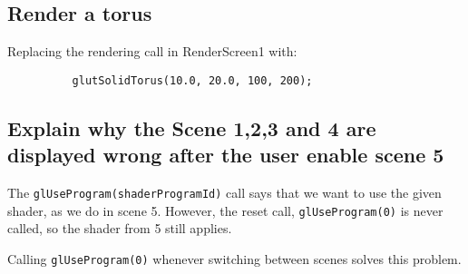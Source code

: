 \documentclass[11pt,a4paper]{article}
\begin{document}
    \subsection{Render a torus} %
      \label{sub:render_a_torus}
      
        Replacing the rendering call in RenderScreen1 with:

        \begin{verbatim}
          glutSolidTorus(10.0, 20.0, 100, 200);
        \end{verbatim}


    \subsection{Explain why the Scene 1,2,3 and 4 are displayed wrong after the user enable scene 5} %
    \label{sub:explain_why_the_scene_1_2_3_and_4_are_displayed_wrong_after_the_user_enable_scene_5}
    
      The \texttt{glUseProgram(shaderProgramId)} call says that we want to use the given shader, as we do in scene 5.
      However, the reset call, \texttt{glUseProgram(0)} is never called, so the shader from 5 still applies.

      Calling \texttt{glUseProgram(0)} whenever switching between scenes solves this problem.

    
\end{document}
